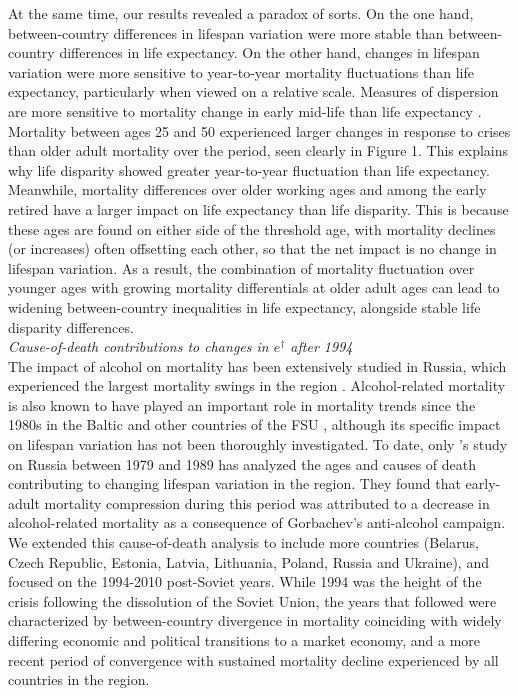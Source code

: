 \documentclass{article}
\begin{document}
\begin{spacing}{1.5}
At the same time, our results revealed a paradox of sorts. On the one hand, between-country differences in lifespan variation were more stable than between-country differences in life expectancy. On the other hand, changes in lifespan variation were more sensitive to year-to-year mortality fluctuations than life expectancy, \textcolor[rgb]{1,0,0}{particularly when viewed on a relative scale}. Measures of dispersion are more sensitive to mortality change in early mid-life than life expectancy \citep{vanraalte2013}. Mortality between ages 25 and 50 \textcolor[rgb]{1,0,0}{experienced larger changes in response to crises} than older adult mortality over the period, seen clearly in Figure 1. This explains why life disparity showed greater year-to-year fluctuation than life expectancy. Meanwhile, mortality differences over older working ages and among the early retired have a larger impact on life expectancy than life disparity. This is because these ages are found on either side of the threshold age, with mortality declines (or increases) often offsetting each other, so that the net impact is no change in lifespan variation. As a result, the combination of mortality fluctuation over younger ages with growing mortality differentials at older adult ages can lead to widening between-country inequalities in life expectancy, alongside stable life disparity differences.
\\

\emph{Cause-of-death contributions to changes in $e^\dagger$ after 1994}\\

The impact of alcohol on mortality has been extensively studied in Russia, which experienced the largest mortality swings in the region \citep{leon1997huge,rehm2007, shkolnikov2013components,shkolnikov2001}. Alcohol-related mortality is also known to have played an important role in mortality trends since the 1980s in the Baltic and other countries of the FSU \citep{rehm2007,jasilionis2011}, 
although its specific impact on lifespan variation has not been thoroughly investigated. To date, only \citet{shkolnikov2003}'s study on Russia between 1979 and 1989 has analyzed the ages and causes of death contributing to changing lifespan variation in the region. They found that early-adult mortality compression during this period was attributed to a decrease in alcohol-related mortality as a consequence of Gorbachev's anti-alcohol campaign. \textcolor[rgb]{0,0.58,0}{We extended this cause-of-death analysis to include more countries (Belarus, Czech Republic, Estonia, Latvia, Lithuania, Poland, Russia and Ukraine), and focused on the 1994-2010 post-Soviet years}. While 1994 was the height of the crisis following the dissolution of the Soviet Union, the years that followed were characterized by between-country divergence in mortality coinciding with widely differing economic and political transitions to a market economy, and a more recent period of convergence with sustained mortality decline experienced by all countries in the region.\\


\end{spacing}
\end{document}
